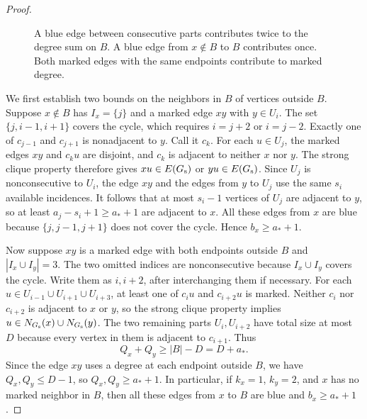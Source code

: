 \documentclass[preprint,11pt,numbers]{elsarticle-arxiv}
\numberwithin{equation}{section}
\theoremstyle{definition}
\begin{document}
\begin{proof}
\begin{figure}[htbp]
\centering
{}
\caption{A blue edge between consecutive parts contributes twice to
the degree sum on $B$. A blue edge from $x\notin B$ to $B$ contributes
once. Both marked edges with the same endpoints contribute to marked degree.}
\label{fig:multigraph-cut}
\end{figure}
\relax\space%

We first establish two bounds on the neighbors in $B$ of vertices
outside $B$. Suppose $x\notin B$ has $I_x=\{j\}$ and a marked edge
$xy$ with $y\in U_i$. The set $\{j,i-1,i+1\}$ covers the cycle,
which requires $i=j+2$ or $i=j-2$. Exactly one of $c_{j-1}$ and
$c_{j+1}$ is nonadjacent to $y$. Call it $c_k$. For each $u\in U_j$,
the marked edges $xy$ and $c_ku$ are disjoint, and $c_k$ is
adjacent to neither $x$ nor $y$. The strong clique property
therefore gives $xu\in E(G_{\rm s})$ or $yu\in E(G_{\rm s})$.
Since $U_j$ is nonconsecutive to $U_i$, the edge $xy$ and the
edges from $y$ to $U_j$ use the same $s_i$ available incidences.
It follows that at most $s_i-1$ vertices of $U_j$ are adjacent to
$y$, so at least $a_j-s_i+1\geq a_*+1$ are adjacent to $x$.
All these edges from $x$ are blue because $\{j,j-1,j+1\}$ does not
cover the cycle. Hence $b_x\geq a_*+1$.

Now suppose $xy$ is a marked edge with both endpoints outside $B$
and $|I_x\cup I_y|=3$. The two omitted indices are nonconsecutive
because $I_x\cup I_y$ covers the cycle. Write them as $i,i+2$,
after interchanging them if necessary. For each
$u\in U_{i-1}\cup U_{i+1}\cup U_{i+3}$, at least one of $c_i u$
and $c_{i+2}u$ is marked. Neither $c_i$ nor $c_{i+2}$ is adjacent
to $x$ or $y$, so the strong clique property implies
$u\in N_{G_{\rm s}}(x)\cup N_{G_{\rm s}}(y)$. The two remaining
parts $U_i,U_{i+2}$ have total size at most $D$ because every
vertex in them is adjacent to $c_{i+1}$. Thus
\[
 Q_x+Q_y\geq |B|-D=D+a_*.
\]
Since the edge $xy$ uses a degree at each endpoint outside $B$,
we have $Q_x,Q_y\leq D-1$, so $Q_x,Q_y\geq a_*+1$. In particular,
if $k_x=1$, $k_y=2$, and $x$ has no marked neighbor in $B$, then
all these edges from $x$ to $B$ are blue and $b_x\geq a_*+1$.


\end{proof}
\end{document}
